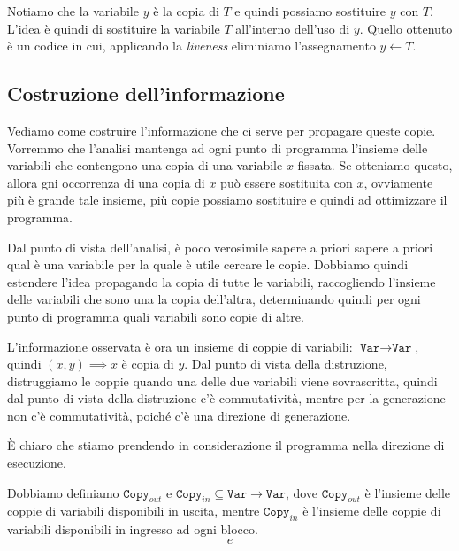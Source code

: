 Notiamo che la variabile $y$ è la copia di $T$ e quindi possiamo sostituire $y$ con $T$.
L'idea è quindi di sostituire la variabile $T$ all'interno dell'uso di $y$. Quello ottenuto 
è un codice in cui, applicando la \textit{liveness} eliminiamo l'assegnamento $y \gets T$.
\subsection{Costruzione dell'informazione}
Vediamo come costruire l'informazione che ci serve per propagare queste copie.
Vorremmo che l'analisi mantenga ad ogni punto di programma l'insieme delle variabili che contengono 
una copia di una variabile $x$ fissata.
Se otteniamo questo, allora gni occorrenza di una copia di $x$ può essere sostituita con $x$, ovviamente 
più è grande tale insieme, più copie possiamo sostituire e quindi ad ottimizzare il programma.

Dal punto di vista dell'analisi, è poco verosimile sapere a priori sapere a priori qual è una variabile 
per la quale è utile cercare le copie. Dobbiamo quindi estendere l'idea propagando la copia di tutte le 
variabili, raccogliendo l'insieme delle variabili che sono una la copia dell'altra, determinando quindi
per ogni punto di programma quali variabili sono copie di altre.

L'informazione osservata è ora un insieme di coppie di variabili: $\texttt{Var} \rightarrow \texttt{Var}$, 
quindi $(x, y) \implies x$ è copia di $y$. Dal punto di vista della distruzione, distruggiamo le coppie 
quando una delle due variabili viene sovrascritta, quindi dal punto di vista della distruzione 
c'è commutatività, mentre per la generazione non c'è commutatività, poiché c'è una direzione di 
generazione.

È chiaro che stiamo prendendo in considerazione il programma nella direzione di esecuzione.

Dobbiamo definiamo $\texttt{Copy}_{out}$ e $\texttt{Copy}_{in} \subseteq \texttt{Var} \rightarrow \texttt{Var}$, dove 
$\texttt{Copy}_{out}$ è l'insieme delle coppie di variabili disponibili in uscita,
mentre $\texttt{Copy}_{in}$ è l'insieme delle coppie di variabili disponibili in ingresso ad ogni blocco.
\begin{equation}
    e
\end{equation}